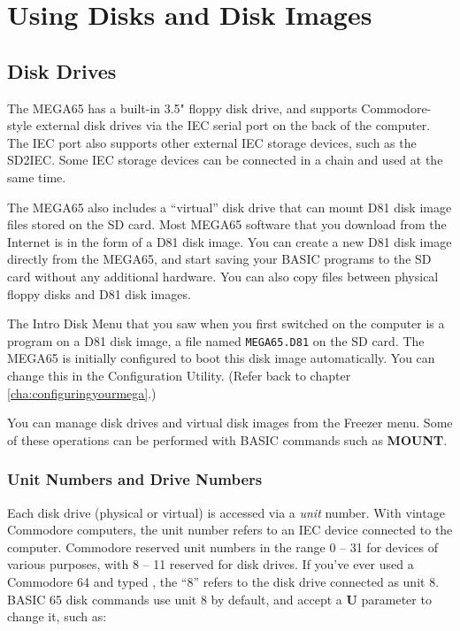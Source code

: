 \chapter{Using Disks and Disk Images}

\section{Disk Drives}
\label{cha:using-disks}

The MEGA65 has a built-in 3.5" floppy disk drive, and supports Commodore-style external disk drives via the IEC serial port on the back of the computer. The IEC port also supports other external IEC storage devices, such as the SD2IEC. Some IEC storage devices can be connected in a chain and used at the same time.

The MEGA65 also includes a ``virtual'' disk drive that can mount D81 disk image files stored on the SD card. Most MEGA65 software that you download from the Internet is in the form of a D81 disk image. You can create a new D81 disk image directly from the MEGA65, and start saving your BASIC programs to the SD card without any additional hardware. You can also copy files between physical floppy disks and D81 disk images.

The Intro Disk Menu that you saw when you first switched on the computer is a program on a D81 disk image, a file named {\tt MEGA65.D81} on the SD card. The MEGA65 is initially configured to boot this disk image automatically. You can change this in the Configuration Utility. (Refer back to chapter \vref{cha:configuringyourmega}.)

You can manage disk drives and virtual disk images from the Freezer menu. Some of these operations can be performed with BASIC commands such as {\bf MOUNT}.

\subsection{Unit Numbers and Drive Numbers}

Each disk drive (physical or virtual) is accessed via a {\it unit} number. With vintage Commodore computers, the unit number refers to an IEC device connected to the computer. Commodore reserved unit numbers in the range 0 -- 31 for devices of various purposes, with 8 -- 11 reserved for disk drives. If you've ever used a Commodore 64 and typed , the ``8'' refers to the disk drive connected as unit 8. BASIC 65 disk commands use unit 8 by default, and accept a {\bf U} parameter to change it, such as: 


